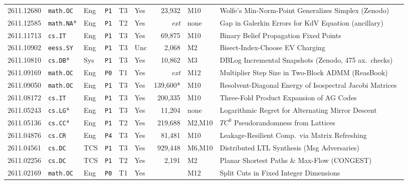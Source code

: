 \documentclass[11pt,letterpaper]{article}
\begin{document}
\begin{table}[p]
\begin{tabularx}{\textwidth}{llllllrlX}
2611.12680 & \texttt{math.OC} & Eng & \texttt{P1} & T3 & Yes & 23,932 & M10 & Wolfe's Min-Norm-Point Generalizes Simplex (Zenodo)~\cite{arxiv2611_12680} \\
2611.12585 & \texttt{math.NA}* & Eng & \texttt{P1} & T2 & Yes & \emph{ext} & none & Gap in Galerkin Errors for KdV Equation (ancillary)~\cite{arxiv2611_12585} \\
2611.11713 & \texttt{cs.IT} & Eng & \texttt{P1} & T3 & Yes & 69,875 & M10 & Binary Belief Propagation Fixed Points~\cite{arxiv2611_11713} \\
2611.10902 & \texttt{eess.SY} & Eng & \texttt{P1} & T3 & Unc & 2,068 & M2 & Bisect-Index-Choose EV Charging~\cite{arxiv2611_10902} \\
2611.10810 & \texttt{cs.DB}* & Sys & \texttt{P1} & T3 & Yes & 10,862 & M3 & DBLog Incremental Snapshots (Zenodo, 475 ax.\ checks)~\cite{arxiv2611_10810} \\
2611.09169 & \texttt{math.OC} & Eng & \texttt{P0} & T1 & Yes & \emph{ext} & M12 & Multiplier Step Size in Two-Block ADMM (ReasBook)~\cite{arxiv2611_09169} \\
2611.09050 & \texttt{math.OC} & Eng & \texttt{P1} & T3 & Yes & 139,600* & M10 & Resolvent-Diagonal Energy of Isospectral Jacobi Matrices~\cite{arxiv2611_09050} \\
2611.08172 & \texttt{cs.IT} & Eng & \texttt{P1} & T3 & Yes & 200,335 & M10 & Three-Fold Product Expansion of AG Codes~\cite{arxiv2611_08172} \\
2611.05243 & \texttt{cs.LG}* & Eng & \texttt{P1} & T3 & Yes & 11,204 & none & Logarithmic Regret for Alternating Mirror Descent~\cite{arxiv2611_05243} \\
2611.05136 & \texttt{cs.CC}* & Eng & \texttt{P1} & T2 & Yes & 219,688 & M2,M10 & $TC^0$ Pseudorandomness from Lattices~\cite{arxiv2611_05136} \\
2611.04876 & \texttt{cs.CR} & Eng & \texttt{P4} & T3 & Yes & 81,481 & M10 & Leakage-Resilient Comp.\ via Matrix Refreshing~\cite{arxiv2611_04876} \\
2611.04561 & \texttt{cs.DC} & TCS & \texttt{P1} & T3 & Yes & 929,448 & M6,M10 & Distributed LTL Synthesis (Msg Adversaries)~\cite{arxiv2611_04561} \\
2611.02256 & \texttt{cs.DC} & TCS & \texttt{P1} & T2 & Yes & 2,191 & M2 & Planar Shortest Paths \& Max-Flow (CONGEST)~\cite{arxiv2611_02256} \\
2611.02169 & \texttt{math.OC} & Eng & \texttt{P0} & T1 & Yes & \textemdash{} & M12 & Split Cuts in Fixed Integer Dimensions~\cite{arxiv2611_02169} \\

\end{tabularx}
\end{table}
\end{document}
